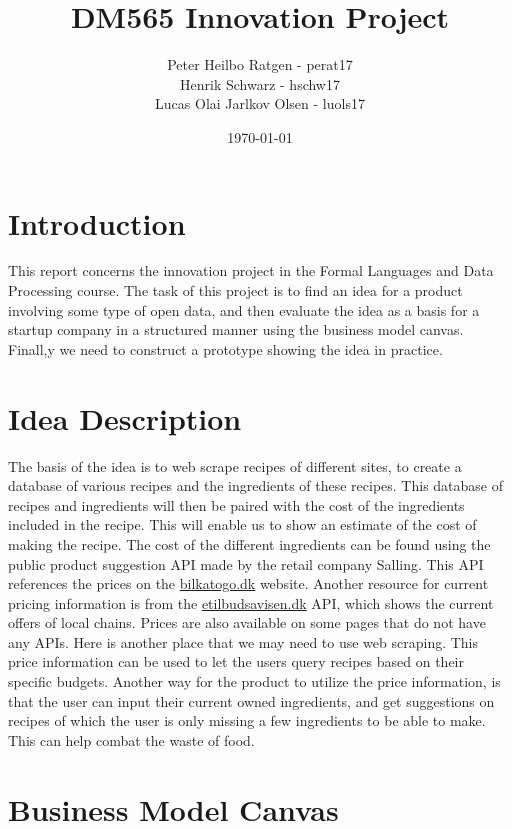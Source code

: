 \documentclass{article}
\title{DM565 Innovation Project}
\author{Peter Heilbo Ratgen - perat17\\
Henrik Schwarz - hschw17\\
Lucas Olai Jarlkov Olsen - luols17}
\date{\today}
\begin{document}
\maketitle

\newpage

\tableofcontents

\newpage

\section{Introduction}
This report concerns the innovation project in the Formal Languages and Data Processing
course. The task of this project is to find an idea for a product involving some type of
open data, and then  evaluate the idea as a
basis for a startup company in a structured manner using the business model canvas.
Finall,y we need to construct a prototype showing the idea in practice. 
\section{Idea Description}
\begin{comment}
 we need to focus our idea, as discussed in the midwayseminar. The best is to have a core
idea that we focus on. 
\end{comment}
The basis of the idea is to  web scrape recipes of different sites, to create a database
of various recipes and the ingredients of these recipes. This database of recipes and
ingredients will then be
paired with the cost of the ingredients included in the recipe. This will enable us to
show an estimate of the cost of making the recipe. The cost of the different ingredients can be
found using the public product suggestion API made by the retail company Salling. This API
references the prices on the \url{bilkatogo.dk} website. Another resource for current
pricing information is from the \url{etilbudsavisen.dk} API, which shows the current
offers of local chains. Prices are also available on some pages that do not have any APIs.
Here is another place that we may need to use web scraping. This price information can
be used to let the users query recipes based on their specific budgets. Another way for
the product to utilize the price information, is that the user can input their current owned
ingredients, and get suggestions on  recipes of which the user is only missing a few
ingredients to be able to make. This can help combat the waste of food.


\section{Business Model Canvas}
\end{document}
